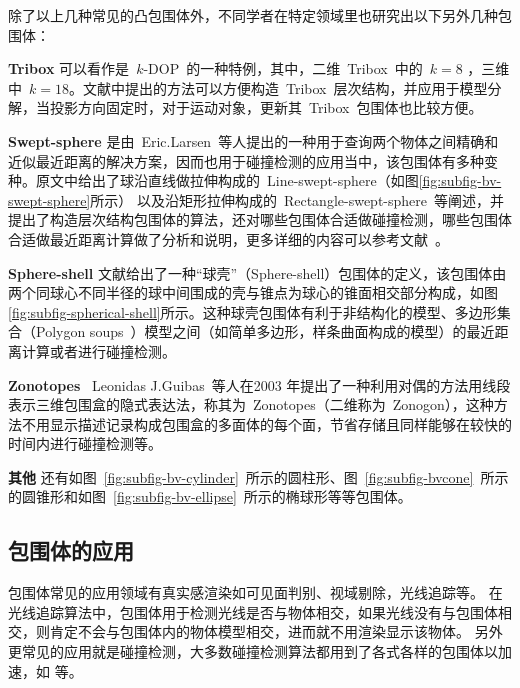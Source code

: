 除了以上几种常见的凸包围体外，不同学者在特定领域里也研究出以下另外几种包围体：\\
\begin{inparaenum}[(1)]
\indent
\item \textbf{Tribox} 可以看作是~$k$-DOP~的一种特例，其中，二维~Tribox~中的~$k=8$ ，三维中~$k=18$。文献中提出的方法可以方便构造~Tribox~层次结构，并应用于模型分解，当投影方向固定时，对于运动对象，更新其~Tribox~包围体也比较方便。 \\ 
\indent
\item \textbf{Swept-sphere}
是由~Eric.Larsen~等人\cite{Larsen1999Fast}提出的一种用于查询两个物体之间精确和近似最近距离的解决方案，因而也用于碰撞检测的应用当中，该包围体有多种变种。原文中给出了球沿直线做拉伸构成的~Line-swept-sphere（如图\ref{fig:subfig-bv-swept-sphere}所示）
以及沿矩形拉伸构成的~Rectangle-swept-sphere~等阐述，并提出了构造层次结构包围体的算法，还对哪些包围体合适做碰撞检测，哪些包围体合适做最近距离计算做了分析和说明，更多详细的内容可以参考文献~。\\
\indent
\item \textbf{Sphere-shell}
文献给出了一种“球壳”（Sphere-shell）包围体的定义，该包围体由两个同球心不同半径的球中间围成的壳与锥点为球心的锥面相交部分构成，如图\ref{fig:subfig-spherical-shell}所示。这种球壳包围体有利于非结构化的模型、多边形集合（Polygon
soups~）模型之间（如简单多边形，样条曲面构成的模型）的最近距离计算或者进行碰撞检测。\\
\indent
\item \textbf{Zonotopes} ~Leonidas
J.Guibas~\cite{Guibas2003Zonotopes}等人在2003 年提出了一种利用对偶的方法用线段表示三维包围盒的隐式表达法，称其为~Zonotopes（二维称为~Zonogon），这种方法不用显示描述记录构成包围盒的多面体的每个面，节省存储且同样能够在较快的时间内进行碰撞检测等。\\
\indent
\item \textbf{其他}
还有如图~\ref{fig:subfig-bv-cylinder}~所示的圆柱形\cite{Schomer2000Smallest}、图~\ref{fig:subfig-bvcone}~所示的圆锥形\cite{held1997erit}和如图~\ref{fig:subfig-bv-ellipse}~所示的椭球形\cite{Wang2004Efficient}等等包围体。
\end{inparaenum}

\subsection{包围体的应用}
\label{subsec:bv:application}

包围体常见的应用领域有真实感渲染如可见面判别、视域剔除\cite{assarsson2000optimized}，光线追踪\cite{wald2007ray}等。
在光线追踪算法中，包围体用于检测光线是否与物体相交，如果光线没有与包围体相交，则肯定不会与包围体内的物体模型相交，进而就不用渲染显示该物体。
另外更常见的应用就是碰撞检测\cite{wangzhiqiang1999}，大多数碰撞检测算法都用到了各式各样的包围体以加速，如
 等。

